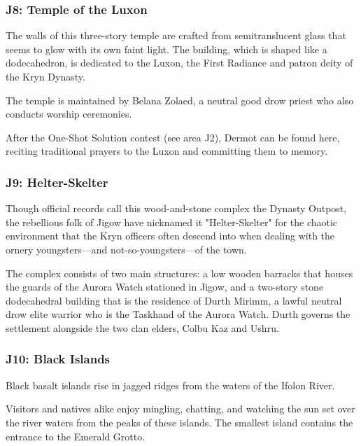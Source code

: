 \documentclass[10pt,a4paper,twoside,bg=print,twocolumn,openany,nodeprecatedcode]{dndbook}
\begin{document}
\subsubsection{J8: Temple of the Luxon}
\begin{DndReadAloud}{}
The walls of this three-story temple are crafted from semitranslucent glass that seems to glow with its own faint light. The building, which is shaped like a dodecahedron, is dedicated to the Luxon, the First Radiance and patron deity of the Kryn Dynasty.

\end{DndReadAloud}

The temple is maintained by Belana Zolaed, a neutral good drow priest who also conducts worship ceremonies.

After the One-Shot Solution contest (see area J2), Dermot can be found here, reciting traditional prayers to the Luxon and committing them to memory.

\subsubsection{J9: Helter-Skelter}
Though official records call this wood-and-stone complex the Dynasty Outpost, the rebellious folk of Jigow have nicknamed it "Helter-Skelter" for the chaotic environment that the Kryn officers often descend into when dealing with the ornery youngsters—and not-so-youngsters—of the town.

The complex consists of two main structures: a low wooden barracks that houses the guards of the Aurora Watch stationed in Jigow, and a two-story stone dodecahedral building that is the residence of Durth Mirimm, a lawful neutral drow elite warrior who is the Taskhand of the Aurora Watch. Durth governs the settlement alongside the two clan elders, Colbu Kaz and Ushru.

\subsubsection{J10: Black Islands}
\begin{DndReadAloud}{}
Black basalt islands rise in jagged ridges from the waters of the Ifolon River.

\end{DndReadAloud}

Visitors and natives alike enjoy mingling, chatting, and watching the sun set over the river waters from the peaks of these islands. The smallest island contains the entrance to the Emerald Grotto.
\end{document}

